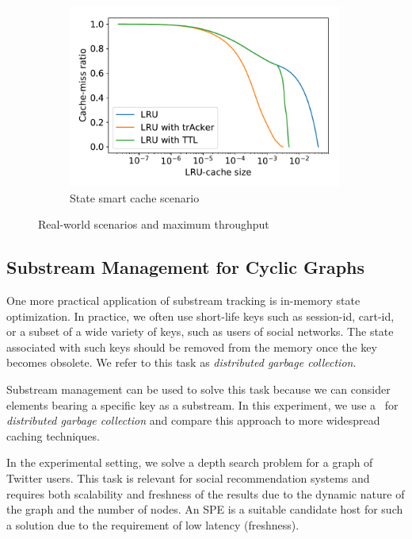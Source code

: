\begin{figure}[t!]
\begin{subfigure}[b]{0.3\textwidth}
            \includegraphics[width=0.99\textwidth]{Chapters/Tracker/pics/dgc_lru_depth_search}
            \caption{State smart cache scenario}
            \label{fig:dgc_lru_depth_search}
    \end{subfigure}
    \caption{Real-world scenarios and maximum throughput}
    \label{various_experiments}
\end{figure}

\subsection{Substream Management for Cyclic Graphs}

One more practical application of substream tracking is in-memory state optimization. In practice, we often use short-life keys such as session-id, cart-id, or a subset of a wide variety of keys, such as users of social networks. The state associated with such keys should be removed from the memory once the key becomes obsolete. We refer to this task as \textit{distributed garbage collection}.

Substream management can be used to solve this task because we can consider elements bearing a specific key as a substream. In this experiment, we use a \tracker\ for \textit{distributed garbage collection} and compare this approach to more widespread caching techniques.

In the experimental setting, we solve a depth search problem for a graph of Twitter users. This task is relevant for social recommendation systems and requires both scalability and freshness of the results due to the dynamic nature of the graph and the number of nodes. An SPE is a suitable candidate host for such a solution due to the requirement of low latency (freshness). 

